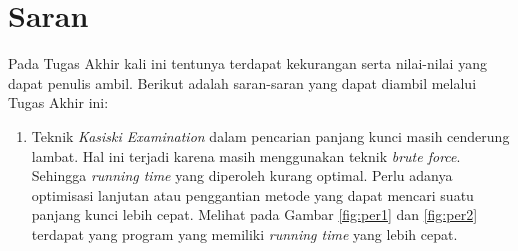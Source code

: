   \section{Saran}
  Pada Tugas Akhir kali ini tentunya terdapat kekurangan serta nilai-nilai yang dapat penulis ambil. Berikut adalah saran-saran yang dapat diambil melalui Tugas Akhir ini:
  \begin{enumerate}
    \item Teknik \textit{Kasiski Examination} dalam pencarian panjang kunci masih cenderung lambat. Hal ini terjadi karena masih menggunakan teknik \textit{brute force}. Sehingga \textit{running time} yang diperoleh kurang optimal. Perlu adanya optimisasi lanjutan atau penggantian metode yang dapat mencari suatu panjang kunci lebih cepat. Melihat pada Gambar \ref{fig:per1} dan \ref{fig:per2} terdapat yang program yang memiliki \textit{running time} yang lebih cepat.%
    
  \end{enumerate}
  
